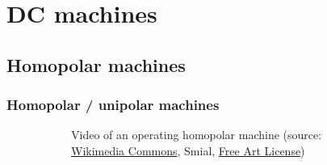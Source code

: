 \section{DC machines}


\subsection{Homopolar machines}

\begin{frame}
	\frametitle{Homopolar / unipolar machines}
    \vspace{-0.3cm}
	\begin{figure}
		\centering
		\begin{subfigure}[b]{0.49\textwidth}
			\centering
            \vspace{0.75cm}
			\caption{Video of an operating homopolar machine (source: \href{https://de.wikipedia.org/wiki/Datei:Homopolarmotor_MAQ03891_smial_wp.ogv}{Wikimedia Commons}, Smial, \href{https://artlibre.org/licence/lal/en/}{Free Art License})}
		\end{subfigure}
		\hfill
		\begin{subfigure}[b]{0.49\textwidth}

\end{subfigure}
\end{figure}
\end{frame}

